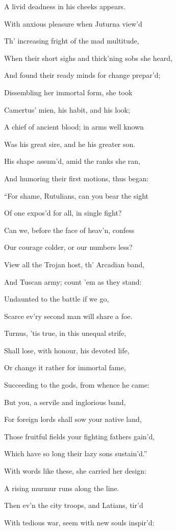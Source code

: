 A livid deadness in his cheeks appears.

With anxious pleasure when Juturna view’d

Th’ increasing fright of the mad multitude,

When their short sighs and thick’ning sobs she heard,

And found their ready minds for change prepar’d;

Dissembling her immortal form, she took

Camertus’ mien, his habit, and his look;

A chief of ancient blood; in arms well known

Was his great sire, and he his greater son.

His shape assum’d, amid the ranks she ran,

And humoring their first motions, thus began:

“For shame, Rutulians, can you bear the sight

Of one expos’d for all, in single fight?

Can we, before the face of heav’n, confess

Our courage colder, or our numbers less?

View all the Trojan host, th’ Arcadian band,

And Tuscan army; count ’em as they stand:

Undaunted to the battle if we go,

Scarce ev’ry second man will share a foe.

Turnus, ’tis true, in this unequal strife,

Shall lose, with honour, his devoted life,

Or change it rather for immortal fame,

Succeeding to the gods, from whence he came:

But you, a servile and inglorious band,

For foreign lords shall sow your native land,

Those fruitful fields your fighting fathers gain’d,

Which have so long their lazy sons sustain’d.”

With words like these, she carried her design:

A rising murmur runs along the line.

Then ev’n the city troops, and Latians, tir’d

With tedious war, seem with new souls inspir’d:

